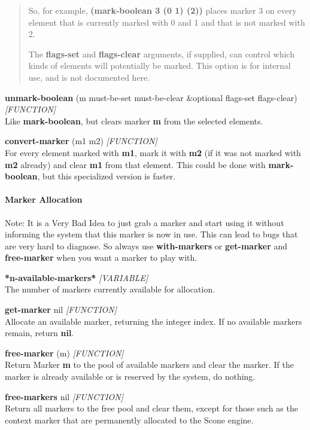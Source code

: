 \documentclass[titlepage,twoside,openright,11pt]{article}
\begin{document}
\begin{quote}
So, for example, \textbf{(mark-boolean 3 \textquotesingle(0 1)
\textquotesingle(2))} places marker 3 on every element that is currently
marked with 0 and 1 and that is not marked with 2.

The \textbf{flags-set} and \textbf{flags-clear} arguments, if supplied,
can control which kinds of elements will potentially be marked. This
option is for internal use, and is not documented here.
\end{quote}

\textbf{unmark-boolean} (m must-be-set must-be-clear \&optional
flags-set flags-clear) \emph{{[}FUNCTION{]}}\\
Like \textbf{mark-boolean}, but clears marker \textbf{m} from the
selected elements.

\textbf{convert-marker} (m1 m2) \emph{{[}FUNCTION{]}}\\
For every element marked with \textbf{m1}, mark it with \textbf{m2} (if
it was not marked with \textbf{m2} already) and clear \textbf{m1} from
that element. This could be done with \textbf{mark-boolean}, but this
specialized version is faster.

\paragraph{Marker Allocation}\label{marker-allocation}

Note: It is a Very Bad Idea to just grab a marker and start using it
without informing the system that this marker is now in use. This can
lead to bugs that are very hard to diagnose. So always use
\textbf{with-markers} or \textbf{get-marker} and \textbf{free-marker}
when you want a marker to play with.

\textbf{*n-available-markers*} \emph{{[}VARIABLE{]}}\\
The number of markers currently available for allocation.

\textbf{get-marker} nil \emph{{[}FUNCTION{]}}\\
Allocate an available marker, returning the integer index. If no
available markers remain, return \textbf{nil}.

\textbf{free-marker} (m) \emph{{[}FUNCTION{]}}\\
Return Marker \textbf{m} to the pool of available markers and clear the
marker. If the marker is already available or is reserved by the system,
do nothing.

\textbf{free-markers} nil \emph{{[}FUNCTION{]}}\\
Return all markers to the free pool and clear them, except for those
such as the context marker that are permanently allocated to the Scone
engine.
\end{document}
